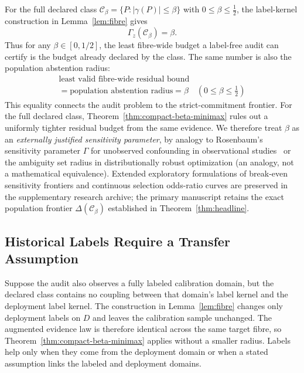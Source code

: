 For the full declared class
$\mathcal C_\beta=\{P:|\gamma(P)|\le\beta\}$ with
$0\le\beta\le\tfrac12$, the label-kernel construction in
Lemma~\ref{lem:fibre} gives
\begin{equation}
 \Gamma_z(\mathcal C_\beta)=\beta.
 \label{eq:compact-beta-radius}
\end{equation}
Thus for any $\beta \in [0, 1/2]$, the least fibre-wide budget a label-free audit can certify is the budget already declared by
the class. The same number is also the population abstention radius:
\[
 \boxed{\begin{gathered}
 \text{least valid fibre-wide residual bound}\\
 =\text{population abstention radius}=\beta \quad (0 \le \beta \le \tfrac12)
 \end{gathered}}
\]
This equality connects the audit problem to the strict-commitment frontier. For the full
declared class, Theorem~\ref{thm:compact-beta-minimax} rules out a uniformly tighter residual
budget from the same evidence. We therefore treat $\beta$ as an
\emph{externally justified sensitivity parameter}, by analogy to Rosenbaum's sensitivity
parameter $\Gamma$ for unobserved confounding in observational studies~\cite{rosenbaum2002observational}
or the ambiguity set radius in distributionally robust optimization (an analogy, not a mathematical
equivalence). Extended exploratory formulations of break-even sensitivity frontiers and continuous selection odds-ratio curves are preserved in the supplementary research archive; the primary manuscript retains the exact population frontier $\Delta(\mathcal{C}_\beta)$ established in Theorem~\ref{thm:headline}.

\subsection{Historical Labels Require a Transfer Assumption}
\label{sec:compact-wrong-domain}

Suppose the audit also observes a fully labeled calibration domain, but the declared class contains
no coupling between that domain's label kernel and the deployment label kernel. The construction in
Lemma~\ref{lem:fibre} changes only deployment labels on $D$ and leaves the calibration sample
unchanged. The augmented evidence law is therefore identical across the same target fibre, so
Theorem~\ref{thm:compact-beta-minimax} applies without a smaller radius. Labels help only when they
come from the deployment domain or when a stated assumption links the labeled and deployment
domains.

